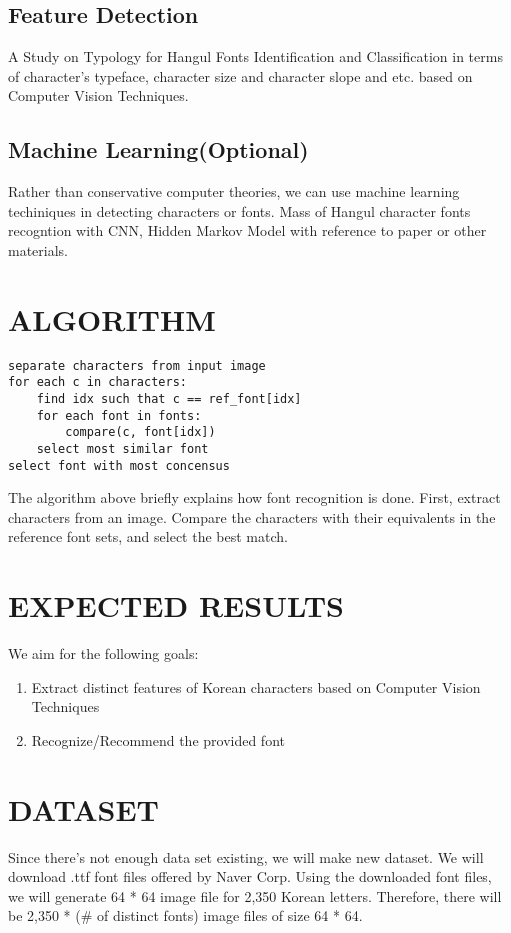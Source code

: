 \documentclass[%
 reprint,
nofootinbib,
nobibnotes,
amsmath,amssymb,
aps,
]{revtex4-1}
\begin{document}
\subsection{\label{sec:level3} Feature Detection}
A Study on Typology for Hangul Fonts Identification and Classification in
terms of character's typeface, character size and character slope and etc.
based on Computer Vision Techniques.

\subsection{\label{sec:level3} Machine Learning(Optional)}
Rather than conservative computer theories, we can use machine learning techiniques
in detecting characters or fonts.
Mass of Hangul character fonts recogntion with CNN, Hidden Markov Model with
reference to paper\cite{tensmeyer} or other materials.

\section{\label{sec:level3} ALGORITHM}

\begin{lstlisting}
separate characters from input image
for each c in characters:
	find idx such that c == ref_font[idx]
	for each font in fonts:
		compare(c, font[idx])
	select most similar font
select font with most concensus
\end{lstlisting}
The algorithm above briefly explains how font recognition is done. First, extract
characters from an image. Compare the characters with their equivalents in the
reference font sets, and select the best match.

\section{\label{sec:level2}EXPECTED RESULTS}
We aim for the following goals:
\begin{enumerate}[topsep=0pt, itemsep=-1ex, partopsep=1ex, parsep=1ex]
  \item Extract distinct features of Korean characters based on Computer Vision
    Techniques
  \item Recognize/Recommend the provided font
\end{enumerate}

\section{\label{sec:level2}DATASET}
Since there's not enough data set existing, we will make new dataset.
We will download .ttf font files offered by Naver Corp.
Using the downloaded font files, we will generate 64 * 64 image file for 2,350 Korean letters.
Therefore, there will be 2,350 * (\# of distinct fonts) image files of size 64 * 64.
\end{document}
